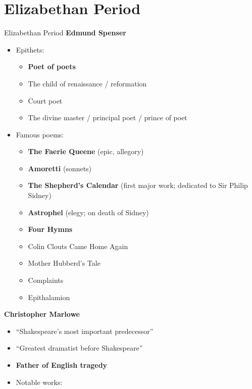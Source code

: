 \documentclass[
  12pt,
    progressbar=frametitle]{beamer}
\providecommand{\tightlist}{%
  \setlength{\itemsep}{0pt}\setlength{\parskip}{0pt}}
\begin{document}
\section{Elizabethan Period}
\begin{frame}[allowframebreaks]
{Elizabethan Period}
\large\textbf{Edmund Spenser}\normalsize\vspace{-3mm}

\begin{itemize}
\tightlist
\item
  Epithets:

  \begin{itemize}
  \tightlist
  \item
    \textbf{Poet of poets}
  \item
    The child of renaissance / reformation
  \item
    Court poet
  \item
    The divine master / principal poet / prince of poet
  \end{itemize}
\item
  Famous poems:

  \begin{itemize}
  \tightlist
  \item
    \textbf{The Faerie Queene} (epic, allegory)
  \item
    \textbf{Amoretti} (sonnets)
  \item
    \textbf{The Shepherd's Calendar} (first major work; dedicated to Sir
    Philip Sidney)
  \item
    \textbf{Astrophel} (elegy; on death of Sidney)
  \item
    \textbf{Four Hymns}
  \item
    Colin Clouts Came Home Again
  \item
    Mother Hubberd's Tale
  \item
    Complaints
  \item
    Epithalamion
  \end{itemize}
\end{itemize}

\large\textbf{Christopher Marlowe}\normalsize\vspace{-3mm}

\begin{itemize}
\tightlist
\item
  ``Shakespeare's most important predecessor''
\item
  ``Greatest dramatist before Shakespeare''
\item
  \textbf{Father of English tragedy}
\item
  Notable works:
\end{itemize}


\end{frame}
\end{document}
